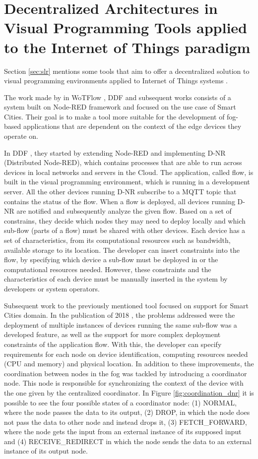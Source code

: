 \section{Decentralized Architectures in Visual Programming Tools applied to the Internet of Things paradigm}\label{sec:sota_decentralized}


Section \ref{sec:slr} mentions some tools that aim to offer a decentralized solution to visual programming environments applied to Internet of Things systems \cite{ddf} \cite{ddflow} \cite{wotflow_dnr}.
\par The work made by in WoTFlow \cite{wotflow_dnr}, DDF \cite{ddf} and subsequent works \cite{fog_at_the_edge} \cite{exogenous_coordination} consists of a system built on Node-RED framework and focused on the use case of Smart Cities. Their goal is to make a tool more suitable for the development of fog-based applications that are dependent on the context of the edge devices they operate on. 
\par In DDF \cite{ddf}, they started by extending Node-RED and implementing D-NR (Distributed Node-RED), which contains processes that are able to run across devices in local networks and servers in the Cloud. The application, called flow, is built in the visual programming environment, which is running in a development server. All the other devices running D-NR subscribe to a MQTT topic that contains the status of the flow. When a flow is deployed, all devices running D-NR are notified and subsequently analyze the given flow. Based on a set of constrains, they decide which nodes they may need to deploy locally and which sub-flow (parts of a flow) must be shared with other devices. Each device has a set of characteristics, from its computational resources such as bandwidth, available storage to its location. The developer can insert constraints into the flow, by specifying which device a sub-flow must be deployed in or the computational resources needed. However, these constraints and the characteristics of each device must be manually inserted in the system by developers or system operators. 
\par Subsequent work to the previously mentioned tool focused on support for Smart Cities domain. In the publication of 2018 \cite{fog_at_the_edge}, the problems addressed were the deployment of multiple instances of devices running the same sub-flow was a developed feature, as well as the support for more complex deployment constraints of the application flow. With this, the developer can specify requirements for each node on device identification, computing resources needed (CPU and memory) and physical location. In addition to these improvements, the coordination between nodes in the fog was tackled by introducing a coordinator node. This node is responsible for synchronizing the context of the device with the one given by the centralized coordinator. In Figure \ref{fig:coordination_dnr} it is possible to see the four possible states of a coordinator node: (1) NORMAL, where the node passes the data to its output, (2) DROP, in which the node does not pass the data to other node and instead drops it, (3) FETCH\_FORWARD, where the node gets the input from an external instance of its supposed input and (4) RECEIVE\_REDIRECT in which the node sends the data to an external instance of its output node.
